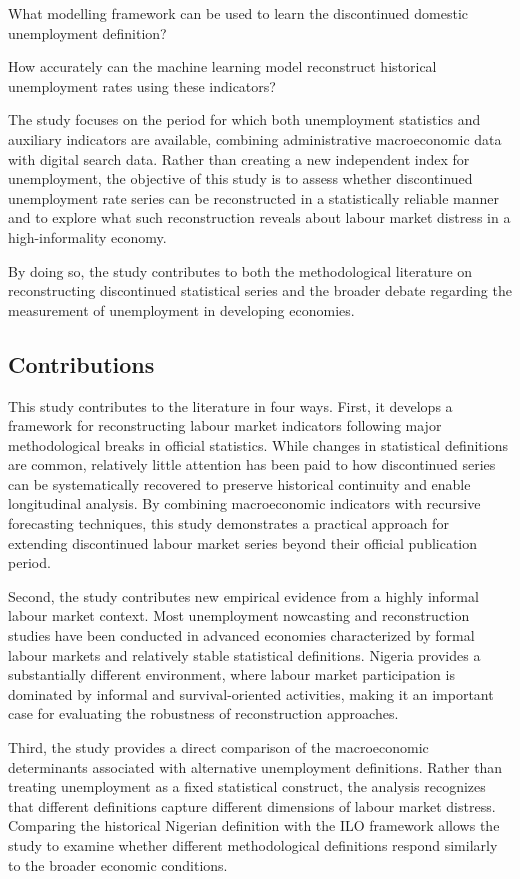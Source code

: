 \documentclass[
  letterpaper,
  DIV=11,
  numbers=noendperiod]{scrartcl}
\begin{document}
What modelling framework can be used to learn the discontinued domestic
unemployment definition?

How accurately can the machine learning model reconstruct historical
unemployment rates using these indicators?

The study focuses on the period for which both unemployment statistics
and auxiliary indicators are available, combining administrative
macroeconomic data with digital search data. Rather than creating a new
independent index for unemployment, the objective of this study is to
assess whether discontinued unemployment rate series can be
reconstructed in a statistically reliable manner and to explore what
such reconstruction reveals about labour market distress in a
high-informality economy.

By doing so, the study contributes to both the methodological literature
on reconstructing discontinued statistical series and the broader debate
regarding the measurement of unemployment in developing economies.

\subsection{Contributions}\label{contributions}

This study contributes to the literature in four ways. First, it
develops a framework for reconstructing labour market indicators
following major methodological breaks in official statistics. While
changes in statistical definitions are common, relatively little
attention has been paid to how discontinued series can be systematically
recovered to preserve historical continuity and enable longitudinal
analysis. By combining macroeconomic indicators with recursive
forecasting techniques, this study demonstrates a practical approach for
extending discontinued labour market series beyond their official
publication period.

Second, the study contributes new empirical evidence from a highly
informal labour market context. Most unemployment nowcasting and
reconstruction studies have been conducted in advanced economies
characterized by formal labour markets and relatively stable statistical
definitions. Nigeria provides a substantially different environment,
where labour market participation is dominated by informal and
survival-oriented activities, making it an important case for evaluating
the robustness of reconstruction approaches.

Third, the study provides a direct comparison of the macroeconomic
determinants associated with alternative unemployment definitions.
Rather than treating unemployment as a fixed statistical construct, the
analysis recognizes that different definitions capture different
dimensions of labour market distress. Comparing the historical Nigerian
definition with the ILO framework allows the study to examine whether
different methodological definitions respond similarly to the broader
economic conditions.
\end{document}

